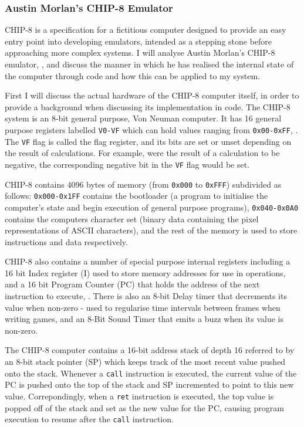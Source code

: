 \subsubsection{Austin Morlan's CHIP-8 Emulator}
CHIP-8 is a specification for a fictitious computer designed to provide an easy entry point into developing emulators, intended as a stepping stone before approaching more complex systems. I will analyse Austin Morlan's CHIP-8 emulator, \textcite{CHIP-8}, and discuss the manner in which he has realised the internal state of the computer through code and how this can be applied to my system.

First I will discuss the actual hardware of the CHIP-8 computer itself, in order to provide a background when discussing its implementation in code. The CHIP-8 system is an 8-bit general purpose, Von Neuman computer. It has 16 general purpose registers labelled \texttt{V0-VF} which can hold values ranging from \texttt{0x00-0xFF}, \textcite{CHIP-8-blog}. The \texttt{VF} flag is called the flag register, and its bits are set or unset depending on the result of calculations. For example, were the result of a calculation to be negative, the corresponding negative bit in the \texttt{VF} flag would be set.

CHIP-8 contains 4096 bytes of memory (from \texttt{0x000} to \texttt{0xFFF}) subdivided as follows: \texttt{0x000-0x1FF} contains the bootloader (a program to initialise the computer's state and begin execution of general purpose programs), \texttt{0x040-0x0A0} contains the computers character set (binary data containing the pixel representations of ASCII characters), and the rest of the memory is used to store instructions and data respectively.

CHIP-8 also contains a number of special purpose internal registers including a 16 bit Index register (I) used to store memory addresses for use in operations, and a 16 bit Program Counter (PC) that holds the address of the next instruction to execute, \textcite{CHIP-8-blog}. There is also an 8-bit Delay timer that decrements its value when non-zero - used to regularise time intervals between frames when writing games, and an 8-Bit Sound Timer that emits a buzz when its value is non-zero.

The CHIP-8 computer contains a 16-bit address stack of depth 16 referred to by an 8-bit stack pointer (SP) which keeps track of the most recent value pushed onto the stack. Whenever a \texttt{call} instruction is executed, the current value of the PC is pushed onto the top of the stack and SP incremented to point to this new value. Correpondingly, when a \texttt{ret} instruction is executed, the top value is popped off of the stack and set as the new value for the PC, causing program execution to resume after the \texttt{call} instruction.

